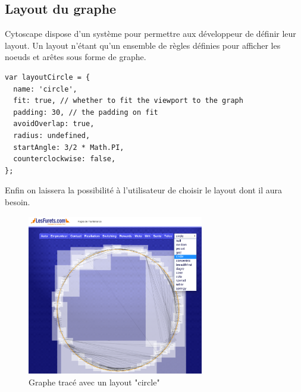 \subsection{Layout du graphe}
Cytoscape dispose d'un système pour permettre aux développeur de définir leur layout. Un layout n'étant qu'un ensemble de règles définies pour afficher les noeuds et arêtes sous forme de graphe.
\begin{lstlisting}[caption=Exemple d'un layout traçant le graphe sous forme de cercle]
var layoutCircle = {
  name: 'circle',
  fit: true, // whether to fit the viewport to the graph
  padding: 30, // the padding on fit
  avoidOverlap: true, 
  radius: undefined, 
  startAngle: 3/2 * Math.PI, 
  counterclockwise: false, 
};
\end{lstlisting}
Enfin on laissera la possibilité à l'utilisateur de choisir le layout dont il aura besoin.
\begin{figure}[!h]
\centering
\includegraphics[height=7cm]{outil/layout-circle.png}
\caption{Graphe tracé avec un layout "circle"}
\end{figure}

